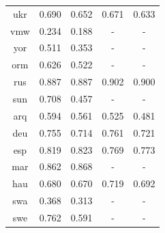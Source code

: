 \documentclass[11pt]{article}
\begin{document}
\begin{table}[]
\begin{tabular}{ccccc}
{\color[HTML]{212121} ukr}          & {\color[HTML]{212121} 0.690} & {\color[HTML]{212121} 0.652} & {\color[HTML]{212121} 0.671} & {\color[HTML]{212121} 0.633} \\
{\color[HTML]{212121} vmw}          & {\color[HTML]{212121} 0.234} & {\color[HTML]{212121} 0.188} & -                            & -                            \\
{\color[HTML]{212121} yor}          & {\color[HTML]{212121} 0.511} & {\color[HTML]{212121} 0.353} & -                            & -                            \\
{\color[HTML]{212121} orm}          & {\color[HTML]{212121} 0.626} & {\color[HTML]{212121} 0.522} & -                            & -                            \\
{\color[HTML]{212121} rus}          & {\color[HTML]{212121} 0.887} & {\color[HTML]{212121} 0.887} & {\color[HTML]{212121} 0.902} & {\color[HTML]{212121} 0.900} \\
{\color[HTML]{212121} sun}          & {\color[HTML]{212121} 0.708} & {\color[HTML]{212121} 0.457} & -                            & -                            \\
{\color[HTML]{212121} arq}          & {\color[HTML]{212121} 0.594} & {\color[HTML]{212121} 0.561} & {\color[HTML]{212121} 0.525} & {\color[HTML]{212121} 0.481} \\
{\color[HTML]{212121} deu}          & {\color[HTML]{212121} 0.755} & {\color[HTML]{212121} 0.714} & {\color[HTML]{212121} 0.761} & {\color[HTML]{212121} 0.721} \\
{\color[HTML]{212121} esp}          & {\color[HTML]{212121} 0.819} & {\color[HTML]{212121} 0.823} & {\color[HTML]{212121} 0.769} & {\color[HTML]{212121} 0.773} \\
{\color[HTML]{212121} mar}          & {\color[HTML]{212121} 0.862} & {\color[HTML]{212121} 0.868} & -                            & -                            \\
{\color[HTML]{212121} hau}          & {\color[HTML]{212121} 0.680} & {\color[HTML]{212121} 0.670} & {\color[HTML]{212121} 0.719} & {\color[HTML]{212121} 0.692} \\
{\color[HTML]{212121} swa}          & {\color[HTML]{212121} 0.368} & {\color[HTML]{212121} 0.313} & -                            & -                            \\
{\color[HTML]{212121} swe}          & {\color[HTML]{212121} 0.762} & {\color[HTML]{212121} 0.591} & -                            & -                            \\

\end{tabular}
\end{table}
\end{document}
